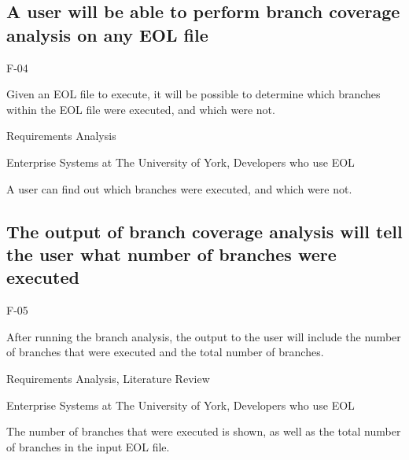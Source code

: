 \subsection{A user will be able to perform branch coverage analysis on any EOL file}
\begin{description}[style=sameline,leftmargin=4.5cm,nolistsep]
\item[\hspace*{0.3cm}Label] F-04
\item[\hspace*{0.3cm}Description] Given an EOL file to execute, it will be possible to determine which branches within the EOL file were executed, and which were not.
\item[\hspace*{0.3cm}Source] Requirements Analysis
\item[\hspace*{0.3cm}Stakeholders] Enterprise Systems at The University of York, Developers who use EOL
\item[\hspace*{0.3cm}Satisfiable Conditions] A user can find out which branches were executed, and which were not.
\end{description}

\subsection{The output of branch coverage analysis will tell the user what number of branches were executed}
\begin{description}[style=sameline,leftmargin=4.5cm,nolistsep]
\item[\hspace*{0.3cm}Label] F-05
\item[\hspace*{0.3cm}Description] After running the branch analysis, the output to the user will include the number of branches that were executed and the total number of branches.
\item[\hspace*{0.3cm}Source] Requirements Analysis, Literature Review
\item[\hspace*{0.3cm}Stakeholders] Enterprise Systems at The University of York, Developers who use EOL
\item[\hspace*{0.3cm}Satisfiable Conditions] The number of branches that were executed is shown, as well as the total number of branches in the input EOL file.
\end{description}

